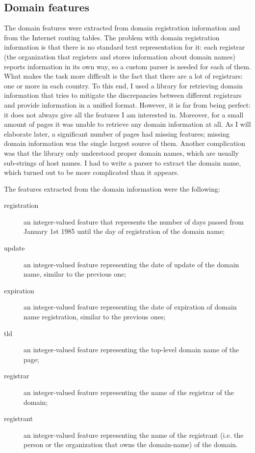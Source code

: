 \documentclass{article}
\begin{document}
\subsection{Domain features}
\label{sec:domain-features}

The domain features were extracted from domain registration
information and from the Internet routing tables. The problem with
domain registration information is that there is no standard text
representation for it: each registrar (the organization that registers
and stores information about domain names) reports information in its
own way, so a custom parser is needed for each of them. What makes the
task more difficult is the fact that there are a lot of registrars:
one or more in each country. To this end, I used a library for
retrieving domain information that tries to mitigate the discrepancies
between different registrars and provide information in a unified
format. However, it is far from being perfect: it does not always give
all the features I am interested in. Moreover, for a small amount of
pages it was unable to retrieve any domain information at all. As I
will elaborate later, a significant number of pages had missing
features; missing domain information was the single largest source of
them. Another complication was that the library only understood proper
domain names, which are usually sub-strings of host names. I had to
write a parser to extract the domain name, which turned out to be more
complicated than it appears.

The features extracted from the domain information were the following:

\begin{description}
\item[registration] an integer-valued feature that represents the
  number of days passed from January 1st 1985 until the day of
  registration of the domain name;

\item[update] an integer-valued feature representing the date of
  update of the domain name, similar to the previous one;

\item[expiration] an integer-valued feature representing the date of
  expiration of domain name registration, similar to the previous
  ones;

\item[tld] an integer-valued feature representing the top-level domain
  name of the page;

\item[registrar] an integer-valued feature representing the name of
  the registrar of the domain;

\item[registrant] an integer-valued feature representing the name of
  the registrant (i.e. the person or the organization that owns the
  domain-name) of the domain.
\end{description}
\end{document}

